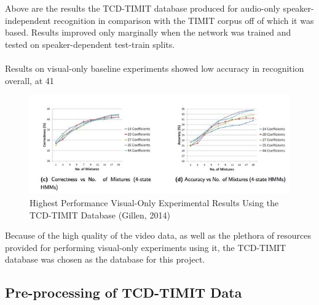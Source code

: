 \documentclass[12pt,twoside]{report}
\begin{document}
Above are the results the TCD-TIMIT database produced for audio-only speaker-independent recognition in comparison with the TIMIT corpus off of which it was based. Results improved only marginally when the network was trained and tested on speaker-dependent test-train splits. 
\\ \\
Results on visual-only baseline experiments showed low accuracy in recognition overall, at 41%

\begin{figure}[tb]
\centering
\includegraphics[width = 1.0\hsize]{./figures/correctnessoftcdtimit}
\caption{Highest Performance Visual-Only Experimental Results Using the TCD-TIMIT Database (Gillen, 2014)}
\label{fig:tcdtimit2}
\end{figure} 

Because of the high quality of the video data, as well as the plethora of resources provided for performing visual-only experiments using it, the TCD-TIMIT database was chosen as the database for this project.

		\subsection{Pre-processing of TCD-TIMIT Data}
\end{document}
